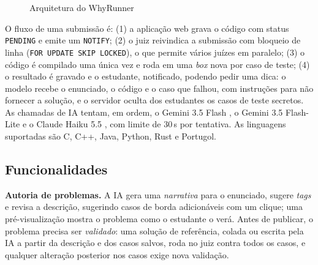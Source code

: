 \documentclass[12pt]{article}
\begin{document}
\begin{figure}[!htb]
\centering
{}
\caption{Arquitetura do WhyRunner}
\label{fig:arquitetura}
\end{figure}

O fluxo de uma submissão é: (1) a aplicação web grava o código com status \texttt{PENDING} e emite um \texttt{NOTIFY}; (2) o juiz reivindica a submissão com bloqueio de linha (\texttt{FOR UPDATE SKIP LOCKED}), o que permite vários juízes em paralelo; (3) o código é compilado uma única vez e roda em uma \emph{box} nova por caso de teste; (4) o resultado é gravado e o estudante, notificado, podendo pedir uma dica: o modelo recebe o enunciado, o código e o caso que falhou, com instruções para não fornecer a solução, e o servidor oculta dos estudantes os casos de teste secretos. As chamadas de IA tentam, em ordem, o Gemini 3.5 Flash \cite{gemini2023}, o Gemini 3.5 Flash-Lite e o Claude Haiku 5.5 \cite{anthropic2026haiku}, com limite de 30\,s por tentativa. As linguagens suportadas são C, C++, Java, Python, Rust e Portugol.

\subsection{Funcionalidades}\label{sec:funcionalidades}

\textbf{Autoria de problemas.} A IA gera uma \emph{narrativa} para o enunciado, sugere \emph{tags} e revisa a descrição, sugerindo casos de borda adicionáveis com um clique; uma pré-visualização mostra o problema como o estudante o verá. Antes de publicar, o problema precisa ser \emph{validado}: uma solução de referência, colada ou escrita pela IA a partir da descrição e dos casos salvos, roda no juiz contra todos os casos, e qualquer alteração posterior nos casos exige nova validação.
\end{document}

